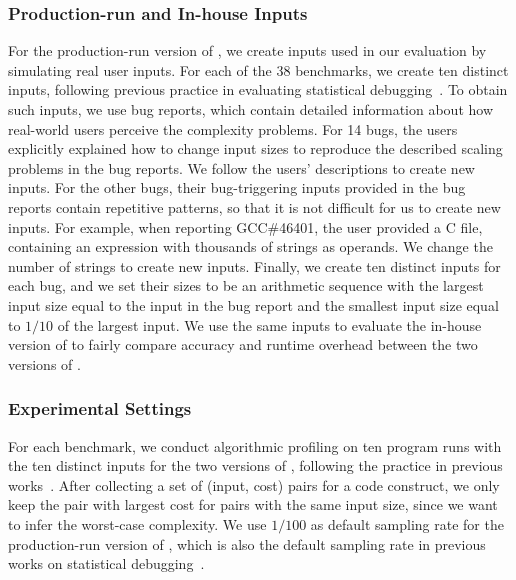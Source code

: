 \subsubsection{Production-run and In-house Inputs}

For the production-run version of \Tool, we create inputs used in our evaluation
by simulating real user inputs.
For each of the 38 benchmarks, we create ten distinct inputs, 
following previous practice in evaluating statistical debugging~\cite{joy.asplos13,SongOOPSLA2014}.
To obtain such inputs, we use bug reports, 
which contain detailed information about how real-world 
users perceive the complexity problems. 
For 14 bugs, 
the users explicitly explained how to change input sizes 
to reproduce the described scaling problems in the bug reports. 
We follow the users' descriptions to create new inputs. 
For the other bugs, their bug-triggering inputs provided 
in the bug reports contain repetitive patterns, 
so that it is not difficult for us to create new inputs.
For example, when reporting GCC\#46401,
the user provided a C file, 
containing an expression with thousands of strings as operands. 
We change the number of strings to create new inputs. 
Finally, we create ten distinct inputs for each bug, 
and we set their sizes 
to be an arithmetic sequence with the largest input size
equal to the input in the bug report and the 
smallest input size equal to $1/10$ 
of the largest input.
We use the same inputs to evaluate the in-house version of \Tool
to fairly compare accuracy and runtime 
overhead between the two versions of \Tool.



\subsubsection{Experimental Settings}

For each benchmark, we conduct algorithmic profiling on ten 
program runs with the ten distinct inputs for the two
versions of \Tool, following the practice in 
previous works~\cite{joy.asplos13,SongOOPSLA2014}.
After collecting a set of (input, cost) pairs for a code construct,
we only keep the pair with largest cost for pairs with the same input size,
since we want to infer the worst-case complexity.
We use $1/100$ as default sampling rate for 
the production-run version of \Tool, 
which is also the default sampling rate 
in previous works on statistical debugging~\cite{liblit03,CCI,ldoctor}.



